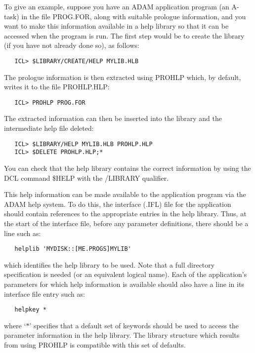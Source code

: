 \documentclass[twoside,11pt]{article}
\renewcommand{\_}{\texttt{\symbol{95}}}
\begin{document}
To give an example, suppose you have an ADAM application program (an A-task)
in the file PROG.FOR, along with suitable prologue information, and you want
to make this information available in a help library so that it can be
accessed when the program is run.
The first step would be to create the library (if you have not already done
so), as follows:

\begin{verbatim}
   ICL> $LIBRARY/CREATE/HELP MYLIB.HLB
\end{verbatim}

The prologue information is then extracted using PROHLP which, by default,
writes it to the file PROHLP.HLP:

\begin{verbatim}
   ICL> PROHLP PROG.FOR
\end{verbatim}

The extracted information can then be inserted into the library and the
intermediate help file deleted:

\begin{verbatim}
   ICL> $LIBRARY/HELP MYLIB.HLB PROHLP.HLP
   ICL> $DELETE PROHLP.HLP;*
\end{verbatim}

You can check that the help library contains the correct information by using
the DCL command \$HELP with the /LIBRARY qualifier.

This help information can be made available to the application program via
the ADAM help system.
To do this, the interface (.IFL) file for the application should contain
references to the appropriate entries in the help library.
Thus, at the start of the interface file, before any parameter definitions,
there should be a line such as:

\begin{verbatim}
   helplib 'MYDISK::[ME.PROGS]MYLIB'
\end{verbatim}

which identifies the help library to be used.
Note that a full directory specification is needed (or an equivalent logical
name).
Each of the application's parameters for which help information is available
should also have a line in its interface file entry such as:

\begin{verbatim}
   helpkey *
\end{verbatim}

where `$*$' specifies that a default set of keywords should be used to
access the parameter information in the help library.
The library structure which results from using PROHLP is compatible with
this set of defaults.
\end{document}
